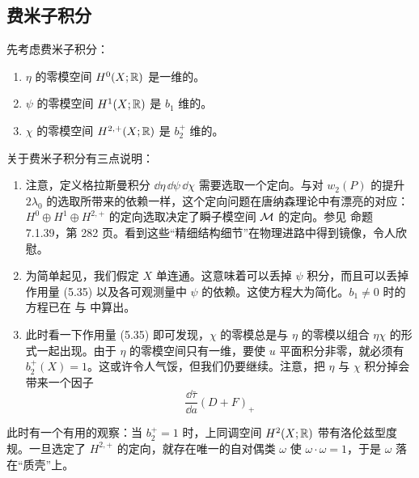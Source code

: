 \subsection{费米子积分}

先考虑费米子积分：
\begin{enumerate}
\item $\eta$ 的零模空间 $H^{0}(X;\mathbb{R})$ 是一维的。
\item $\psi$ 的零模空间 $H^{1}(X;\mathbb{R})$ 是 $b_1$ 维的。
\item $\chi$ 的零模空间 $H^{2,+}(X;\mathbb{R})$ 是 $b_2^{+}$ 维的。
\end{enumerate}

关于费米子积分有三点说明：

\begin{enumerate}
\item 注意，定义格拉斯曼积分 $\dd\eta\,\dd\psi\,\dd\chi$ 需要选取一个定向。与对 $w_2(P)$ 的提升 $2\lambda_0$ 的选取所带来的依赖一样，这个定向问题在唐纳森理论中有漂亮的对应：$H^{0}\oplus H^{1}\oplus H^{2,+}$ 的定向选取决定了瞬子模空间 $\mathcal{M}$ 的定向。参见 \cite{ref8} 命题 7.1.39，第 282 页。看到这些“精细结构细节”在物理进路中得到镜像，令人欣慰。
\item 为简单起见，我们假定 $X$ 单连通。这意味着可以丢掉 $\psi$ 积分，而且可以丢掉作用量 (5.35) 以及各可观测量中 $\psi$ 的依赖。这使方程大为简化。$b_1\neq0$ 时的方程已在 \cite{ref38} 与 \cite{ref30} 中算出。
\item 此时看一下作用量 (5.35) 即可发现，$\chi$ 的零模总是与 $\eta$ 的零模以组合 $\eta\chi$ 的形式一起出现。由于 $\eta$ 的零模空间只有一维，要使 $u$ 平面积分非零，就必须有 $b_2^{+}(X)=1$。这或许令人气馁，但我们仍要继续。注意，把 $\eta$ 与 $\chi$ 积分掉会带来一个因子
\begin{equation}
\frac{\dd\bar\tau}{\dd a}(D+F)_{+}
\tag{7.2}
\end{equation}
\end{enumerate}

此时有一个有用的观察：当 $b_2^{+}=1$ 时，上同调空间 $H^{2}(X;\mathbb{R})$ 带有洛伦兹型度规。一旦选定了 $H^{2,+}$ 的定向，就存在唯一的自对偶类 $\omega$ 使 $\omega\cdot\omega=1$，于是 $\omega$ 落在“质壳”上。

